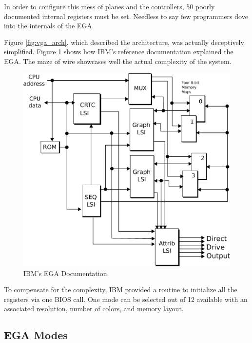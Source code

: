 \documentclass[book.tex]{subfiles}
\begin{document}
\par
In order to configure this mess of planes and the controllers, 50 poorly documented internal registers must be set. Needless to say few programmers dove into the internals of the EGA.\\
\par
  Figure \ref{fig:vga_arch}, which described the architecture, was actually deceptively simplified. Figure \ref{fig:ibm_ega} shows how IBM's reference documentation explained the EGA. The maze of wire showcases well the actual complexity of the system.\\
 \par
 \vspace{10pt}
 \begin{figure}[H]
\centering
\includegraphics[width=\textwidth]{imgs/drawings/ibm_ega.eps}
\caption{IBM's EGA Documentation.}
\label{fig:ibm_ega}
\end{figure}

\bigskip



To compensate for the complexity, IBM provided a routine to initialize all the registers via one BIOS call. One mode can be selected out of 12 available with an associated resolution, number of colors, and memory layout.

\subsection{EGA Modes}
\end{document}
